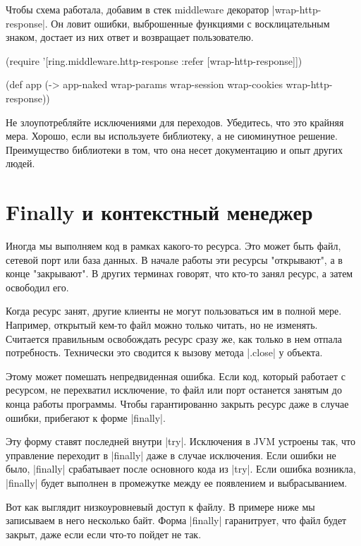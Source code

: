 Чтобы схема работала, добавим в стек middleware декоратор
\spverb|wrap-http-response|. Он ловит ошибки, выброшенные функциями с восклицательным
знаком, достает из них ответ и возвращает пользователю.

\begin{code}
(require '[ring.middleware.http-response
           :refer [wrap-http-response]])

(def app
  (-> app-naked
      wrap-params
      wrap-session
      wrap-cookies
      wrap-http-response))
\end{code}

Не злоупотребляйте исключениями для переходов. Убедитесь, что это крайняя
мера. Хорошо, если вы используете библиотеку, а не сиюминутное
решение. Преимущество библиотеки в том, что она несет документацию и опыт других
людей.

\section{Finally и контекстный менеджер}

Иногда мы выполняем код в рамках какого-то ресурса. Это может быть файл, сетевой
порт или база данных. В начале работы эти ресурсы "открывают", а в конце
"закрывают". В других терминах говорят, что кто-то занял ресурс, а затем
освободил его.

Когда ресурс занят, другие клиенты не могут пользоваться им в полной
мере. Например, открытый кем-то файл можно только читать, но не
изменять. Считается правильным освобождать ресурс сразу же, как только в нем
отпала потребность. Технически это сводится к вызову метода \spverb|.close| у объекта.

Этому может помешать непредвиденная ошибка. Если код, который работает с
ресурсом, не перехватил исключение, то файл или порт останется занятым до конца
работы программы. Чтобы гарантированно закрыть ресурс даже в случае ошибки,
прибегают к форме \spverb|finally|.

Эту форму ставят последней внутри \spverb|try|. Исключения в JVM устроены так, что
управление переходит в \spverb|finally| даже в случае исключения. Если ошибки не было,
\spverb|finally| срабатывает после основного кода из \spverb|try|. Если ошибка возникла,
\spverb|finally| будет выполнен в промежутке между ее появлением и выбрасыванием.

Вот как выглядит низкоуровневый доступ к файлу. В примере ниже мы записываем в
него несколько байт. Форма \spverb|finally| гаранитрует, что файл будет закрыт, даже
если если что-то пойдет не так.

